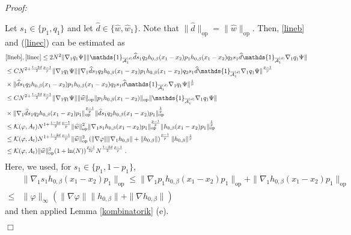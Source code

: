\documentclass[11pt, english, american]{article}
\newenvironment{proof}{\emph{Proof:}}{\begin{flushright} $ \Box $ \end{flushright}}
\renewcommand{\phi}{\varphi}
\begin{document}
\begin{proof}
\begin{enumerate}
Let $s_1 \in \lbrace p_1, q_1 \rbrace$ and let $
\widehat{d} \in \lbrace \widehat{w}, \widehat{w}_1 \rbrace$. 
Note that $ \| \widehat{d} \|_{\text{op}}= \| \widehat{w} \|_{\text{op}}$.
Then,
\eqref{lineb} and (\ref{linec}) can be estimated as
\begin{align*}
&
\eqref{lineb},
\eqref{linec}
\leq
2N^2
\| \nabla_1 q_1 \Psi \|
\|
\mathds{1}_{\overline{\mathcal{A}}^{(d)}_{1}} \widehat{d}  s_1 q_2 h_{0,\beta}(x_1-x_2)
p_1h_{0,\beta}(x_1-x_2)q_2s_1\widehat{d} \mathds{1}_{\overline{\mathcal{A}}^{(d)}_{1}}\nabla_1q_1\Psi\|
\\
& 
\leq
C
N^{2+ \frac{1-2d}{2}\frac{p-1}{p}}
\| \nabla_1 q_1 \Psi \|
\|
\nabla_1\widehat{d} s_1 q_2 h_{0,\beta}(x_1-x_2)
p_1h_{0,\beta}(x_1-x_2)q_2s_1\widehat{d}\mathds{1}_{\overline{\mathcal{A}}^{(d)}_{1}}\nabla_1q_1\Psi
\|^{\frac{p-1}{p}}
\\
&\times 
\|
\widehat{d} s_1 q_2 h_{0,\beta}(x_1-x_2)
p_1h_{0,\beta}(x_1-x_2)q_2s_1\widehat{d}\mathds{1}_{\overline{\mathcal{A}}^{(d)}_{1}}\nabla_1q_1\Psi\|
^{\frac{1}{p}}
\\
&
\leq 
C N^{2+ \frac{1-2d}{2}\frac{p-1}{p}}
\| \nabla_1 q_1 \Psi \|
\|  \widehat{w}\|_{\text{op}}
\|p_1  h_{0,\beta}(x_1-x_2)\|_{\text{op}}
\|\mathds{1}_{\overline{\mathcal{A}}^{(d)}_{1}}\nabla_1q_1\Psi \|
\\
&\times 
\|\nabla_1\widehat{d} s_1 q_2 h_{0,\beta}(x_1-x_2)
p_1\|_{\text{op}}^{\frac{p-1}{p}}
\|\widehat{d} s_1 q_2 h_{0,\beta}(x_1-x_2)
p_1\|_{\text{op}}^{\frac{1}{p}}
\\
& \leq
\mathcal{K}(\phi,A_t)
 N^{1+\frac{1-2d}{2}\frac{p-1}{p}} \|  \widehat{w}\|_{\text{op}}^2
\|\nabla_1 s_1 h_{0,\beta}(x_1-x_2)
p_1\|_{\text{op}}^{\frac{p-1}{p}}
\|h_{0,\beta}(x_1-x_2)
p_1\|_{\text{op}}^{\frac{1}{p}}
\\
&
\leq
\mathcal{K}(\phi,A_t)
 N^{1+\frac{1-2d}{2}\frac{p-1}{p}}
 \|  \widehat{w}\|_{\text{op}}^2
\left(
\|\nabla \phi\|
\| \nabla_1 h_{0,\beta}\|+ \|h_{0,\beta}\| 
\right)^{\frac{p-1}{p}}
\|h_{0,\beta}\| ^{\frac{1}{p}}
\\
& \leq \mathcal{K}(\phi,A_t)  \|  \widehat{w}\|_{\text{op}}^2
(1 +\ln(N))^{ \frac{p-1}{2p}}
N^{\frac{1-2d}{2}\frac{p-1}{p}}
\;.
\end{align*}
Here, we used, for $s_1 \in \lbrace p_1, 1- p_1 \rbrace$,
\begin{align*}
&\|\nabla_1 s_1 h_{0,\beta}(x_1-x_2)
p_1\|_{\text{op}}
\leq
\|\nabla_1 p_1 h_{0,\beta}(x_1-x_2)
p_1\|_{\text{op}}
+\|\nabla_1 h_{0,\beta}(x_1-x_2)
p_1\|_{\text{op}}
\\
\leq &
\| \varphi \|_\infty
\left(
\| \nabla \varphi \|
 \| h_{0,\beta}\| 
+
\| \nabla h_{0,\beta}\| 
\right)
\end{align*}
and then applied Lemma \ref{kombinatorik} (e).


\end{enumerate}
\end{proof}
\end{document}
